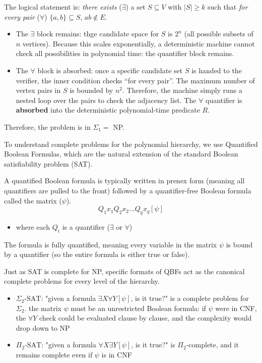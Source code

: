 \documentclass[a4paper, 11pt]{report}
\begin{document}
The logical statement is: \textit{there exists} ($\exists$) a set $S \subseteq V$ with $|S| \ge k$ such that \textit{for every pair} ($\forall$) $\{a, b\} \subseteq S$, $ab \notin E$.

\begin{itemize}
    \item The $\exists$ block remains: thge candidate space for $S$ is $2^n$ (all possible subsets of $n$ vertices). Because this scales exponentially, a deterministic machine cannot check all possibilities in polynomial time: the quantifier block remains.
    \item The $\forall$ block is absorbed: once a specific candidate set $S$ is handed to the verifier, the inner condition checks ``for every pair''. The maximum number of vertex pairs in $S$ is bounded by $n^2$. Therefore, the machine simply runs a nested loop over the pairs to check the adjacency list. The $\forall$ quantifier is \textbf{absorbed} into the deterministic polynomial-time predicate $R$.
\end{itemize}

Therefore, the problem is in $\Sigma_1 = $ NP.


To understand complete problems for the polynomial hierarchy, we use Quantified Boolean Formulas, which are the natural extension of the standard Boolean satisfiability problem (SAT).

\begin{defframe}{}{}
A quantified Boolean formula is typically written in prenex form (meaning all quantifiers are pulled to the front) followed by a quantifier-free Boolean formula called the matrix ($\psi$).
$$Q_1x_1 Q_2x_2 \dots Q_qx_q [\psi]$$
\begin{itemize}
    \item where each $Q_{i}$ is a quantifier ($\exists  $ or $\forall  $)
\end{itemize}

The formula is fully quantified, meaning every variable in the matrix $\psi$ is bound by a quantifier (so the entire formula is either true or false).
\end{defframe}

Just as SAT is complete for NP, specific formats of QBFs act as the canonical complete problems for every level of the hierarchy.

\begin{itemize}
    \item $\Sigma_2\text{-SAT}$: "given a formula $\exists X \forall Y [\psi]$, is it true?" is a complete problem for $\Sigma_2$. 
        \subitem the matrix $\psi$ must be an unrestricted Boolean formula: if $\psi$ were in CNF, the $\forall Y$ check could be evaluated clause by clause, and the complexity would drop down to NP
    \item $\Pi_2\text{-SAT}$: "given a formula $\forall X \exists Y [\psi]$, is it true?" is $\Pi_2$-complete, and it remains complete even if $\psi$ is in CNF
\end{itemize}
\end{document}
